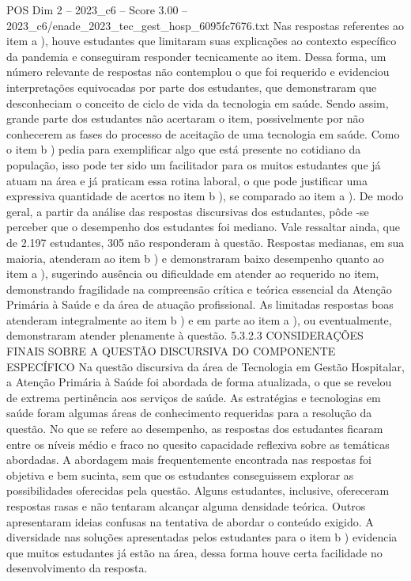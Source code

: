 \begin{textsample}{POS Dim 2 – 2023\_c6 – Score 3.00 – 2023\_c6/enade\_2023\_tec\_gest\_hosp\_6095fc7676.txt}
Nas respostas referentes ao item a ), houve estudantes que limitaram suas explicações ao contexto específico da pandemia e conseguiram responder tecnicamente ao item.
Dessa forma, um número relevante de respostas não contemplou o que foi requerido e evidenciou interpretações equivocadas por parte dos estudantes, que demonstraram que desconheciam o conceito de ciclo de vida da tecnologia em saúde.
Sendo assim, grande parte dos estudantes não acertaram o item, possivelmente por não conhecerem as fases do processo de aceitação de uma tecnologia em saúde.
Como o item b ) pedia para exemplificar algo que está presente no cotidiano da população, isso pode ter sido um facilitador para os muitos estudantes que já atuam na área e já praticam essa rotina laboral, o que pode justificar uma expressiva quantidade de acertos no item b ), se comparado ao item a ).
De modo geral, a partir da análise das respostas discursivas dos estudantes, pôde -se perceber que o desempenho dos estudantes foi mediano.
Vale ressaltar ainda, que de 2.197 estudantes, 305 não responderam à questão.
Respostas medianas, em sua maioria, atenderam ao item b ) e demonstraram baixo desempenho quanto ao item a ), sugerindo ausência ou dificuldade em atender ao requerido no item, demonstrando fragilidade na compreensão crítica e teórica essencial da Atenção Primária à Saúde e da área de atuação profissional.
As limitadas respostas boas atenderam integralmente ao item b ) e em parte ao item a ), ou eventualmente, demonstraram atender plenamente à questão. 5.3.2.3 CONSIDERAÇÕES FINAIS SOBRE A QUESTÃO DISCURSIVA DO COMPONENTE ESPECÍFICO Na questão discursiva da área de Tecnologia em Gestão Hospitalar, a Atenção Primária à Saúde foi abordada de forma atualizada, o que se revelou de extrema pertinência aos serviços de saúde.
As estratégias e tecnologias em saúde foram algumas áreas de conhecimento requeridas para a resolução da questão.
No que se refere ao desempenho, as respostas dos estudantes ficaram entre os níveis médio e fraco no quesito capacidade reflexiva sobre as temáticas abordadas.
A abordagem mais frequentemente encontrada nas respostas foi objetiva e bem sucinta, sem que os estudantes conseguissem explorar as possibilidades oferecidas pela questão.
Alguns estudantes, inclusive, ofereceram respostas rasas e não tentaram alcançar alguma densidade teórica.
Outros apresentaram ideias confusas na tentativa de abordar o conteúdo exigido.
A diversidade nas soluções apresentadas pelos estudantes para o item b ) evidencia que muitos estudantes já estão na área, dessa forma houve certa facilidade no desenvolvimento da resposta.

\end{textsample}
